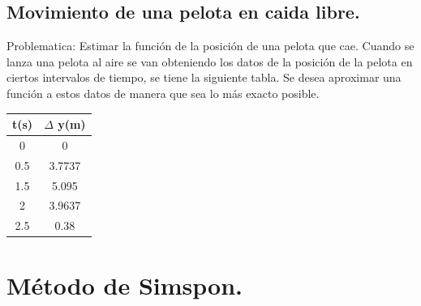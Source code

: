 \documentclass[12pt]{beamer}
\begin{document}
\subsection{Movimiento de una pelota en caida libre.}
\begin{frame}{Problematica: Estimar la función de la posición de una pelota que cae.}
Cuando se lanza una pelota al aire se van obteniendo los datos de la posición de la pelota en ciertos intervalos de tiempo, se tiene la siguiente tabla. Se desea aproximar una función a estos datos de manera que sea lo más exacto posible.
\begin{table}[H]
\centering
\begin{tabular}{|c|c|} \hline
t(s) & $\Delta $ y(m) \\ \hline 
0 & 0 \\ \hline 
0.5 & 3.7737 \\  \hline 
1.5 & 5.095 \\ \hline 
2 & 3.9637 \\ \hline 
2.5  & 0.38 \\ \hline 
\end{tabular} 
\end{table}
\end{frame}


\section{Método de Simspon.}
\end{document}
